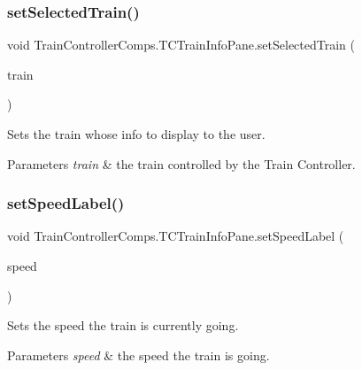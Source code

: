 \subsubsection{\texorpdfstring{set\+Selected\+Train()}{setSelectedTrain()}}
{\footnotesize\ttfamily void Train\+Controller\+Comps.\+T\+C\+Train\+Info\+Pane.\+set\+Selected\+Train (\begin{DoxyParamCaption}\item[{\hyperlink{classTrainControllerComps_1_1TestTrain}{Test\+Train}}]{train }\end{DoxyParamCaption})}



Sets the train whose info to display to the user. 


\begin{DoxyParams}{Parameters}
{\em train} & the train controlled by the Train Controller. \\
\hline
\end{DoxyParams}
\mbox{\label{classTrainControllerComps_1_1TCTrainInfoPane_aaa8d8d930a3d0cce4286f44e0600b820}} 
\subsubsection{\texorpdfstring{set\+Speed\+Label()}{setSpeedLabel()}}
{\footnotesize\ttfamily void Train\+Controller\+Comps.\+T\+C\+Train\+Info\+Pane.\+set\+Speed\+Label (\begin{DoxyParamCaption}\item[{double}]{speed }\end{DoxyParamCaption})}



Sets the speed the train is currently going. 


\begin{DoxyParams}{Parameters}
{\em speed} & the speed the train is going. \\
\hline
\end{DoxyParams}
\mbox{\label{classTrainControllerComps_1_1TCTrainInfoPane_ab2965544592b8ee90697d9ad4c0d00de}} 
